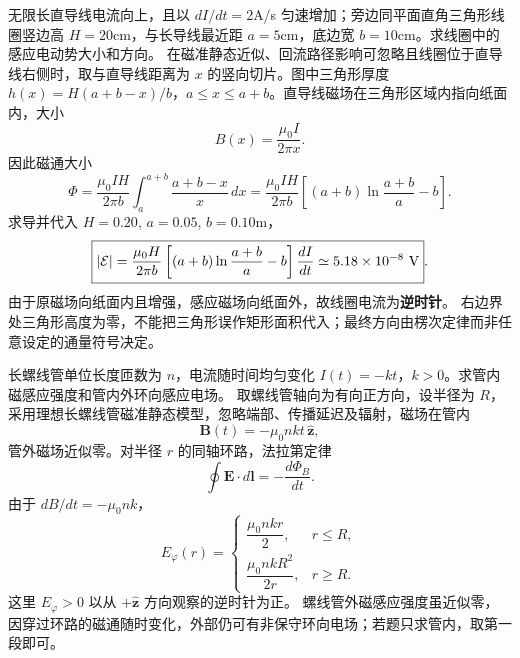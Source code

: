 \problemtext 无限长直导线电流向上，且以 $dI/dt=2$A/s 匀速增加；旁边同平面直角三角形线圈竖边高 $H=20$cm，与长导线最近距 $a=5$cm，底边宽 $b=10$cm。求线圈中的感应电动势大小和方向。
\workings 在磁准静态近似、回流路径影响可忽略且线圈位于直导线右侧时，取与直导线距离为 $x$ 的竖向切片。图中三角形厚度 $h(x)=H(a+b-x)/b$，$a\le x\le a+b$。直导线磁场在三角形区域内指向纸面内，大小
\[B(x)=\frac{\mu_0I}{2\pi x}.\]
因此磁通大小
\[
\Phi=\frac{\mu_0 I H}{2\pi b}
\int_a^{a+b}\frac{a+b-x}{x}\,dx
=\frac{\mu_0 I H}{2\pi b}
\left[(a+b)\ln\frac{a+b}{a}-b\right].
\]
求导并代入 $H=0.20$, $a=0.05$, $b=0.10$m，
\[
\boxed{|\mathcal E|=\frac{\mu_0 H}{2\pi b}
\left[(a+b)\ln\frac{a+b}{a}-b\right]\frac{dI}{dt}
\simeq5.18\times10^{-8}\ {\rm V}}.
\]
由于原磁场向纸面内且增强，感应磁场向纸面外，故线圈电流为\textbf{逆时针}。
\crosscheck 右边界处三角形高度为零，不能把三角形误作矩形面积代入；最终方向由楞次定律而非任意设定的通量符号决定。

\problemtext 长螺线管单位长度匝数为 $n$，电流随时间均匀变化 $I(t)=-kt$，$k>0$。求管内磁感应强度和管内外环向感应电场。
\workings 取螺线管轴向为有向正方向，设半径为 $R$，采用理想长螺线管磁准静态模型，忽略端部、传播延迟及辐射，磁场在管内
\[\boxed{\bm B(t)=-\mu_0nkt\,\hat{\bm z}},\]
管外磁场近似零。对半径 $r$ 的同轴环路，法拉第定律
\[\oint\bm E\cdot d\bm l=-\frac{d\Phi_B}{dt}.\]
由于 $dB/dt=-\mu_0nk$，
\[
\boxed{E_\varphi(r)=
\begin{cases}
\dfrac{\mu_0nkr}{2},&r\le R,\\[4pt]
\dfrac{\mu_0nkR^2}{2r},&r\ge R.
\end{cases}}
\]
这里 $E_\varphi>0$ 以从 $+\hat{\bm z}$ 方向观察的逆时针为正。
\crosscheck 螺线管外磁感应强度虽近似零，因穿过环路的磁通随时变化，外部仍可有非保守环向电场；若题只求管内，取第一段即可。
